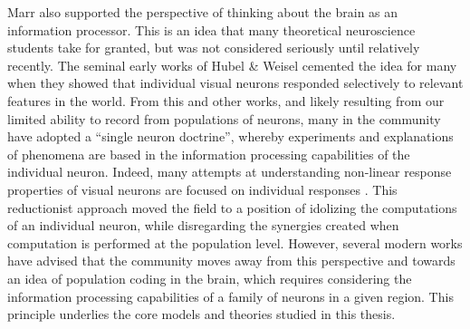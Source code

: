 Marr also supported the perspective of thinking about the brain as an information processor. This is an idea that many theoretical neuroscience students take for granted, but was not considered seriously until relatively recently. The seminal early works of Hubel \& Weisel \citeyearpar{hubel1959receptive} cemented the idea for many when they showed that individual visual neurons responded selectively to relevant features in the world. From this and other works, and likely resulting from our limited ability to record from populations of neurons, many in the community have adopted a ``single neuron doctrine'', whereby experiments and explanations of phenomena are based in the information processing capabilities of the individual neuron. Indeed, many attempts at understanding non-linear response properties of visual neurons are focused on individual responses \parencite{priebe2012mechanisms}. This reductionist approach moved the field to a position of idolizing the computations of an individual neuron, while disregarding the synergies created when computation is performed at the population level. However, several modern works have advised that the community moves away from this perspective \parencite{barlow1972single, olshausen1999probabilistic, zetzsche1999atoms, series2003silent} and towards an idea of population coding in the brain, which requires considering the information processing capabilities of a family of neurons in a given region. This principle underlies the core models and theories studied in this thesis.

